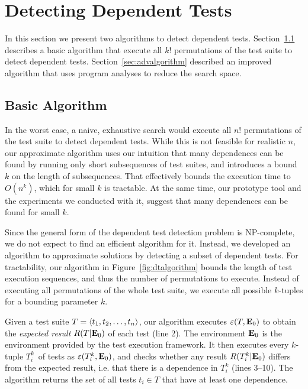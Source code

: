 \section{Detecting Dependent Tests}
\label{sec:detecting}

In this section we present two algorithms to detect dependent
tests. Section~\ref{sec:basic} describes a basic algorithm that
execute all $k!$ permutations of the test suite to detect dependent
tests. Section~\ref{sec:advalgorithm} described an improved algorithm
that uses program analyses to reduce the search space.




\subsection{Basic Algorithm}
\label{sec:basic}


In the worst case, a naive, exhaustive search would execute all $n!$
permutations of the test suite to detect dependent tests. While this
is not feasible for realistic $n$, our approximate algorithm uses 
our intuition that many dependences can be found by running only short subsequences of
test suites, and introduces a bound $k$ on the length
of subsequences. That effectively bounds the execution time to
$O(n^k)$, which for small $k$ is tractable. At the same time, our
prototype tool and the experiments we conducted with it, suggest that
many dependences can be found for small $k$.

\newcommand{\testlist}[0]{\ensuremath{T^k_i}}
\newcommand{\executeTestsInOrder}[1]{\result{#1}{\env_0}}
Since the general form of the dependent test detection problem is
NP-complete, we do not expect to find an efficient algorithm for it.
Instead, we developed an algorithm to approximate solutions by
detecting a subset of dependent
tests. %
For tractability, our algorithm in Figure~\ref{fig:dtalgorithm} bounds the length of
test execution sequences, and thus the number of permutations to
execute. Instead of executing all permutations of the
whole test suite, we execute all possible $k$-tuples for a bounding
parameter $k$.

Given a test suite $T =  \langle t_1, t_2, \ldots, t_n \rangle $, our algorithm
executes $\varepsilon(T,\mathbf{E}_0)$ to obtain the \emph{expected result}
$R(T|\mathbf{E}_0)$ of each test (line 2). The environment $\mathbf{E}_0$
is the environment provided by the test execution framework.
It then executes every $k$-tuple \testlist\ of tests as
$\exec{\testlist}{\env_0}$, and 
checks whether any result $\result{\testlist}{\env_0}$ differs
from the expected result, i.e.
that there is a dependence in $\testlist$
(lines 3--10). The algorithm returns the set of all tests $t_i \in T$
that have at least one dependence.


